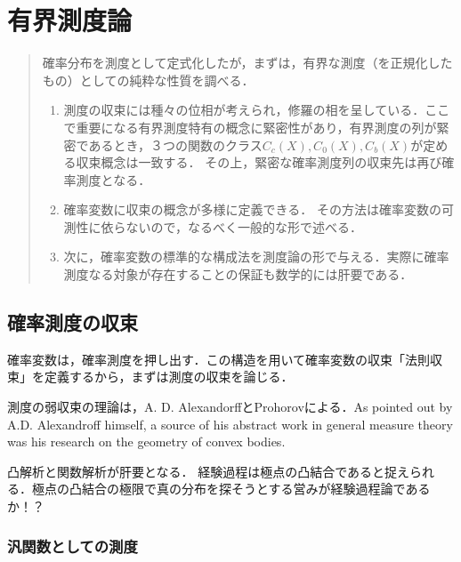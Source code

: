 \documentclass[uplatex,dvipdfmx]{jsreport}
\begin{document}
\chapter{有界測度論}

\begin{quotation}
    確率分布を測度として定式化したが，まずは，有界な測度（を正規化したもの）としての純粋な性質を調べる．
    \begin{enumerate}
        \item 測度の収束には種々の位相が考えられ，修羅の相を呈している．ここで重要になる有界測度特有の概念に緊密性があり，有界測度の列が緊密であるとき，３つの関数のクラス$C_c(X),C_0(X),C_b(X)$が定める収束概念は一致する．
        その上，緊密な確率測度列の収束先は再び確率測度となる．
        \item 確率変数に収束の概念が多様に定義できる．
        その方法は確率変数の可測性に依らないので，なるべく一般的な形で述べる．
        \item 次に，確率変数の標準的な構成法を測度論の形で与える．実際に確率測度なる対象が存在することの保証も数学的には肝要である．
    \end{enumerate}
\end{quotation}

\section{確率測度の収束}

\begin{tcolorbox}[colframe=ForestGreen, colback=ForestGreen!10!white,breakable,colbacktitle=ForestGreen!40!white,coltitle=black,fonttitle=\bfseries\sffamily,
    title=Banach空間論の発展を後押しした消息]
    確率変数は，確率測度を押し出す．この構造を用いて確率変数の収束「法則収束」を定義するから，まずは測度の収束を論じる．

    測度の弱収束の理論は，A. D. AlexandorffとProhorovによる．As pointed out by A.D. Alexandroﬀ himself, a source of his abstract work
    in general measure theory was his research on the geometry of convex bodies.

    凸解析と関数解析が肝要となる．
    経験過程は極点の凸結合であると捉えられる．極点の凸結合の極限で真の分布を探そうとする営みが経験過程論であるか！？
\end{tcolorbox}

\subsection{汎関数としての測度}
\end{document}
